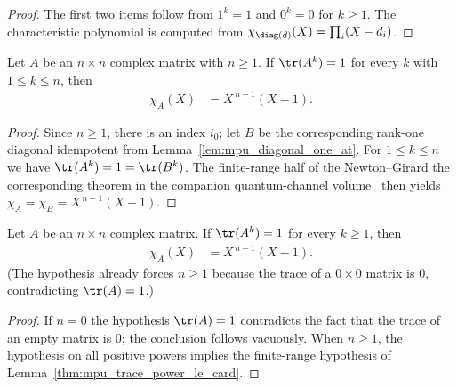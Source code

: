 \begin{proof}\leanok
    The first two items follow from $1^k=1$ and $0^k=0$ for $k\ge 1$.
    The characteristic polynomial is computed from
    $\chi_{\diag(d)}(X) = \prod_i (X - d_i)$.
\end{proof}

\begin{lemma}
    \label{thm:mpu_trace_power_le_card}
    \leanok
    Let $A$ be an $n\times n$ complex matrix with $n\ge 1$.  If
    $\tr(A^k)=1$ for every $k$ with $1\le k\le n$, then
    \begin{align}
        \chi_A(X) & = X^{\,n-1}(X-1).
    \end{align}
\end{lemma}

\begin{proof}\leanok
    Since $n\ge1$, there is an index $i_0$;
    let $B$ be the corresponding rank-one diagonal idempotent from
    Lemma~\ref{lem:mpu_diagonal_one_at}.  For $1\le k\le n$ we have
    $\tr(A^k)=1=\tr(B^k)$.  The finite-range half of the Newton--Girard
    the corresponding theorem in the companion quantum-channel volume~\cite[``Newton--Girard trace recursion'']{QICLean2026Blueprint} then yields $\chi_A = \chi_B =
        X^{\,n-1}(X-1)$.
\end{proof}

\begin{lemma}
    \label{thm:mpu_trace_power_all}
    \leanok
    Let $A$ be an $n\times n$ complex matrix.  If $\tr(A^k)=1$ for
    every $k\ge 1$, then
    \begin{align}
        \chi_A(X) & = X^{\,n-1}(X-1).
    \end{align}
    (The hypothesis already forces $n\ge 1$ because the trace of a
    $0\times0$ matrix is $0$, contradicting $\tr(A)=1$.)
\end{lemma}

\begin{proof}\leanok
    If $n=0$ the hypothesis $\tr(A)=1$ contradicts the fact that the
    trace of an empty matrix is $0$; the conclusion follows vacuously.
    When $n\ge1$, the hypothesis on all positive powers implies the
    finite-range hypothesis of Lemma~\ref{thm:mpu_trace_power_le_card}.
\end{proof}

